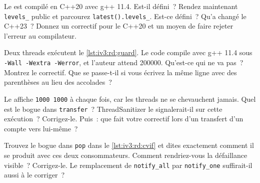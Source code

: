 \begin{question}\label{iq:iv3:reading-debugging-and-software-design:12}
Le  est compilé en C++20 avec g++ 11.4. Est-il défini~? Rendez maintenant \texttt{levels\_} public et parcourez \texttt{latest().levels\_}. Est-ce défini~? Qu'a changé le C++23~? Donnez un correctif pour le C++20 et un moyen de faire rejeter l'erreur au compilateur.
\label{lst:iv3:rd:temprange}
\end{question}

\begin{question}\label{iq:iv3:reading-debugging-and-software-design:13}
Deux threads exécutent le \cref{lst:iv3:rd:guard}. Le code compile avec g++ 11.4 sous \texttt{-Wall -Wextra -Werror}, et l'auteur attend 200000. Qu'est-ce qui ne va pas~? Montrez le correctif. Que se passe-t-il si vous écrivez la même ligne avec des parenthèses au lieu des accolades~?
\label{lst:iv3:rd:guard}
\end{question}

\begin{question}\label{iq:iv3:reading-debugging-and-software-design:14}
Le  affiche \texttt{1000 1000} à chaque fois, car les threads ne se chevauchent jamais. Quel est le bogue dans \texttt{transfer}~? ThreadSanitizer le signalerait-il sur cette exécution~? Corrigez-le. Puis~: que fait votre correctif lors d'un transfert d'un compte vers lui-même~?
\label{lst:iv3:rd:lockorder}
\end{question}

\begin{question}\label{iq:iv3:reading-debugging-and-software-design:15}
Trouvez le bogue dans \texttt{pop} dans le \cref{lst:iv3:rd:cvif} et dites exactement comment il se produit avec ces deux consommateurs. Comment rendriez-vous la défaillance visible~? Corrigez-le. Le remplacement de \texttt{notify\_all} par \texttt{notify\_one} suffirait-il aussi à le corriger~?
\label{lst:iv3:rd:cvif}
\end{question}

